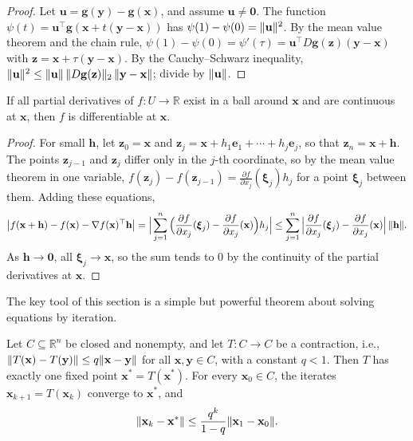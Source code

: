 \begin{proof}
    Let $\mathbf{u} = \mathbf{g}(\mathbf{y}) - \mathbf{g}(\mathbf{x})$, and assume $\mathbf{u} \neq \mathbf{0}$. The function $\psi(t) = \mathbf{u}^\top\mathbf{g}(\mathbf{x} + t(\mathbf{y} - \mathbf{x}))$ has $\psi(1) - \psi(0) = \lVert \mathbf{u} \rVert^2$. By the mean value theorem and the chain rule, $\psi(1) - \psi(0) = \psi'(\tau) = \mathbf{u}^\top D\mathbf{g}(\mathbf{z})(\mathbf{y} - \mathbf{x})$ with $\mathbf{z} = \mathbf{x} + \tau(\mathbf{y} - \mathbf{x})$. By the Cauchy--Schwarz inequality, $\lVert \mathbf{u} \rVert^2 \leq \lVert \mathbf{u} \rVert\,\lVert D\mathbf{g}(\mathbf{z}) \rVert_2\,\lVert \mathbf{y} - \mathbf{x} \rVert$; divide by $\lVert \mathbf{u} \rVert$.
\end{proof}

\begin{proposition}\label{A-prop:C1}
    If all partial derivatives of $f: U \to \mathbb{R}$ exist in a ball around $\mathbf{x}$ and are continuous at $\mathbf{x}$, then $f$ is differentiable at $\mathbf{x}$.
\end{proposition}

\begin{proof}
    For small $\mathbf{h}$, let $\mathbf{z}_0 = \mathbf{x}$ and $\mathbf{z}_j = \mathbf{x} + h_1\mathbf{e}_1 + \cdots + h_j\mathbf{e}_j$, so that $\mathbf{z}_n = \mathbf{x} + \mathbf{h}$. The points $\mathbf{z}_{j-1}$ and $\mathbf{z}_j$ differ only in the $j$-th coordinate, so by the mean value theorem in one variable, $f(\mathbf{z}_j) - f(\mathbf{z}_{j-1}) = \frac{\partial f}{\partial x_j}(\boldsymbol{\xi}_j)h_j$ for a point $\boldsymbol{\xi}_j$ between them. Adding these equations,
    \[\big|f(\mathbf{x} + \mathbf{h}) - f(\mathbf{x}) - \nabla f(\mathbf{x})^\top\mathbf{h}\big| = \Big|\sum_{j=1}^n \Big(\frac{\partial f}{\partial x_j}(\boldsymbol{\xi}_j) - \frac{\partial f}{\partial x_j}(\mathbf{x})\Big)h_j\Big| \leq \sum_{j=1}^n \Big|\frac{\partial f}{\partial x_j}(\boldsymbol{\xi}_j) - \frac{\partial f}{\partial x_j}(\mathbf{x})\Big| \, \lVert \mathbf{h} \rVert.\]
    As $\mathbf{h} \to \mathbf{0}$, all $\boldsymbol{\xi}_j \to \mathbf{x}$, so the sum tends to $0$ by the continuity of the partial derivatives at $\mathbf{x}$.
\end{proof}

The key tool of this section is a simple but powerful theorem about solving equations by iteration.

\begin{theorem}\label{A-thm:banach}
    Let $C \subseteq \mathbb{R}^n$ be closed and nonempty, and let $T: C \to C$ be a contraction, i.e., $\lVert T(\mathbf{x}) - T(\mathbf{y}) \rVert \leq q\lVert \mathbf{x} - \mathbf{y} \rVert$ for all $\mathbf{x}, \mathbf{y} \in C$, with a constant $q < 1$. Then $T$ has exactly one fixed point $\mathbf{x}^* = T(\mathbf{x}^*)$. For every $\mathbf{x}_0 \in C$, the iterates $\mathbf{x}_{k+1} = T(\mathbf{x}_k)$ converge to $\mathbf{x}^*$, and
    \[\lVert \mathbf{x}_k - \mathbf{x}^* \rVert \leq \frac{q^k}{1 - q}\lVert \mathbf{x}_1 - \mathbf{x}_0 \rVert.\]
\end{theorem}

